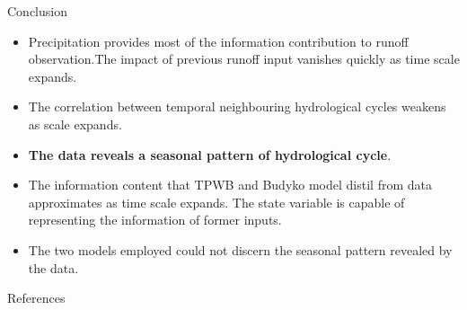\documentclass[final]{beamer}
\newlength{\onecolwid}
\begin{document}
\begin{frame}[t]
\begin{columns}[t]
\begin{column}{\onecolwid}
\begin{block}{Conclusion}
\begin{itemize}
\item Precipitation provides most of the information contribution to runoff observation.The impact of previous runoff input vanishes quickly as time scale expands. 
\item The correlation between temporal neighbouring hydrological cycles weakens as scale expands. 
\item \textbf{The data reveals a seasonal pattern of hydrological cycle}. 
\item The information content that TPWB and Budyko
model distil from data approximates as time scale expands. The state variable is capable of representing the information of former inputs. 
\item The two models employed could not discern the seasonal pattern revealed by the data. 
\end{itemize}
 

\end{block} 

\begin{block}{References}

\nocite{*} %
\tiny{
\vspace{0.in}}

\end{block}








\end{column}
\end{columns}
\end{frame}
\end{document}
